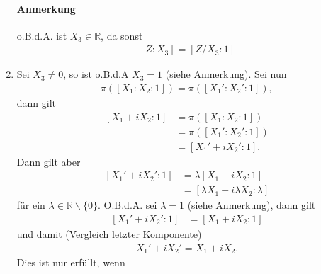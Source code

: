 \documentclass[11pt]{article}
\begin{document}
\begin{enumerate}
	\paragraph{Anmerkung} o.B.d.A. ist $ X_3 \in \mathbb{R} $, da sonst
	\begin{equation*}
	\begin{aligned}
	\left[Z :X_3\right] = \left[Z/X_3 : 1\right]
	\end{aligned}
	\end{equation*}
	\item Sei $ X_3 \neq 0 $, so ist o.B.d.A $ X_3 = 1 $ (siehe Anmerkung). Sei nun
	\begin{equation*}
	\begin{aligned}
	\pi\left(\left[X_1:X_2:1\right]\right) = \pi\left(\left[X_1':X_2':1\right]\right),
	\end{aligned}
	\end{equation*}
	dann gilt
	\begin{equation*}
	\begin{aligned}
	\left[X_1+iX_2 :1 \right] &= \pi\left(\left[X_1:X_2:1\right]\right)\\
	&= \pi\left(\left[X_1':X_2':1\right]\right)\\
	&= \left[X_1'+iX_2' :1 \right].
	\end{aligned}
	\end{equation*}
	Dann gilt aber
	\begin{equation*}
	\begin{aligned}
	\left[X_1'+iX_2' :1 \right] &= \lambda \left[X_1+iX_2 :1 \right]\\
	&= \left[\lambda X_1+i \lambda X_2 :\lambda \right]
	\end{aligned}
	\end{equation*}
	für ein $ \lambda \in \mathbb{R}\backslash\lbrace0\rbrace $. O.B.d.A. sei $ \lambda = 1 $ (siehe Anmerkung), dann gilt
	\begin{equation*}
	\begin{aligned}
		\left[X_1'+iX_2' :1 \right] &= \left[X_1+iX_2 :1 \right]
	\end{aligned}
	\end{equation*}
	und damit (Vergleich letzter Komponente)
	\begin{equation*}
	\begin{aligned}
	X_1'+iX_2' = X_1+iX_2.
	\end{aligned}
	\end{equation*}
	Dies ist nur erfüllt, wenn
	\begin{equation*}
	\begin{aligned}

\end{aligned}
\end{equation*}
\end{enumerate}
\end{document}

